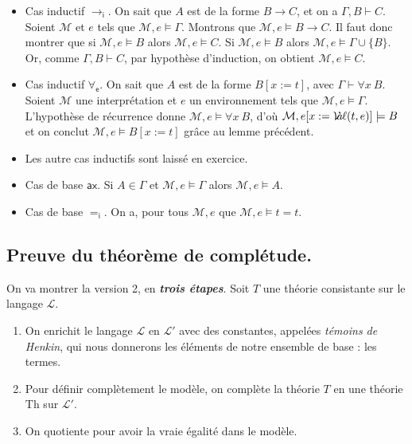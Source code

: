 \documentclass[./main]{subfiles}
\begin{document}
\begin{prv}
\begin{prv}
      \begin{itemize}
        \item Cas inductif $\to_\mathsf{i}$.
          On sait que $A$ est de la forme $B \to C$, et on a $\Gamma, B \vdash C$.
          Soient $\mathcal{M}$ et $e$ tels que $\mathcal{M}, e \models \Gamma$.
          Montrons que $\mathcal{M}, e \models B \to C$.
          Il faut donc montrer que si $\mathcal{M}, e \models B$ alors $\mathcal{M}, e \models C$.
          Si $\mathcal{M}, e \models B$ alors $\mathcal{M}, e \models \Gamma \cup \{B\}$.
          Or, comme $\Gamma, B \vdash C$, par hypothèse d'induction, on obtient $\mathcal{M}, e \models C$.
        \item Cas inductif $\forall_\mathsf{e}$.
          On sait que $A$ est de la forme $B[x := t]$, avec $\Gamma \vdash \forall x \: B$.
          Soient $\mathcal{M}$ une interprétation et $e$ un environnement tels que $\mathcal{M}, e \models \Gamma$. L'hypothèse de récurrence donne $\mathcal{M}, e \models \forall x \: B$, d'où $\mathcal{M}, e[x := \mathcal{V}\hspace{-3.5pt}a\hspace{-0.5pt}\ell(t, e)] \models B$ et on conclut $\mathcal{M}, e \models B[x := t]$ grâce au lemme précédent.
        \item Les autre cas inductifs sont laissé en exercice.
        \item Cas de base $\mathsf{ax}$.
          Si $A \in \Gamma$ et $\mathcal{M}, e \models \Gamma$ alors $\mathcal{M}, e \models A$.
        \item Cas de base $=_\mathsf{i}$.
          On a, pour tous $\mathcal{M}, e$ que $\mathcal{M}, e \models t = t$.
      \end{itemize}
      \vspace{-\baselineskip}
    \end{prv}
  \end{prv}

  \subsection{Preuve du théorème de complétude.}

  On va montrer la version 2, en \textbf{\textit{trois étapes}}.
  Soit $T$ une théorie consistante sur le langage $\mathcal{L}$.
  \begin{enumerate}
    \item On enrichit le langage $\mathcal{L}$ en $\mathcal{L}'$  avec des constantes, appelées \textit{témoins de Henkin}, qui nous donnerons les éléments de notre ensemble de base : les termes.
    \item Pour définir complètement le modèle, on complète la théorie $T$ en une théorie $\mathrm{Th}$ sur $\mathcal{L}'$.
    \item On quotiente pour avoir la vraie égalité dans le modèle.
  \end{enumerate}
\end{document}
